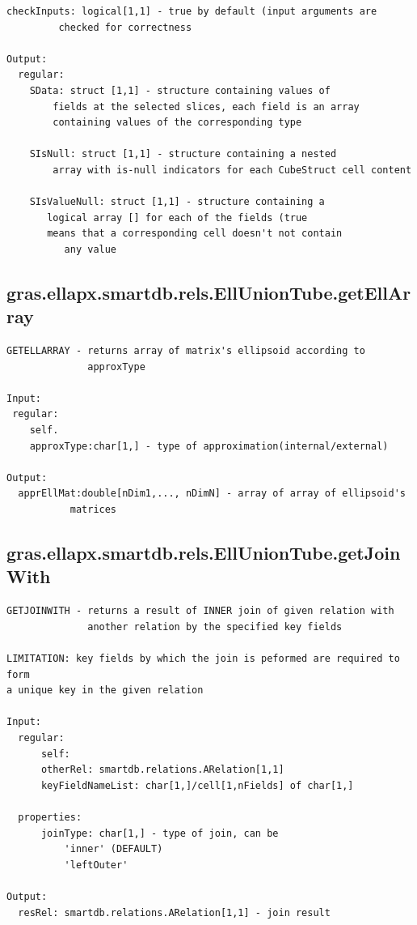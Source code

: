 \documentclass[letterpaper,10pt,english]{sphinxmanual}
\begin{document}
\begin{Verbatim}[commandchars=\\\{\}]
      checkInputs: logical[1,1] - true by default (input arguments are
         checked for correctness

Output:
  regular:
    SData: struct [1,1] - structure containing values of
        fields at the selected slices, each field is an array
        containing values of the corresponding type

    SIsNull: struct [1,1] - structure containing a nested
        array with is-null indicators for each CubeStruct cell content

    SIsValueNull: struct [1,1] - structure containing a
       logical array [] for each of the fields (true
       means that a corresponding cell doesn't not contain
          any value
\end{Verbatim}


\subsection{gras.ellapx.smartdb.rels.EllUnionTube.getEllArray}
\label{chap_functions:gras-ellapx-smartdb-rels-elluniontube-getellarray}
\begin{Verbatim}[commandchars=\\\{\}]
GETELLARRAY - returns array of matrix's ellipsoid according to
              approxType

Input:
 regular:
    self.
    approxType:char[1,] - type of approximation(internal/external)

Output:
  apprEllMat:double[nDim1,..., nDimN] - array of array of ellipsoid's
           matrices
\end{Verbatim}


\subsection{gras.ellapx.smartdb.rels.EllUnionTube.getJoinWith}
\label{chap_functions:gras-ellapx-smartdb-rels-elluniontube-getjoinwith}
\begin{Verbatim}[commandchars=\\\{\}]
GETJOINWITH - returns a result of INNER join of given relation with
              another relation by the specified key fields

LIMITATION: key fields by which the join is peformed are required to form
a unique key in the given relation

Input:
  regular:
      self:
      otherRel: smartdb.relations.ARelation[1,1]
      keyFieldNameList: char[1,]/cell[1,nFields] of char[1,]

  properties:
      joinType: char[1,] - type of join, can be
          'inner' (DEFAULT)
          'leftOuter'

Output:
  resRel: smartdb.relations.ARelation[1,1] - join result
\end{Verbatim}
\end{document}
